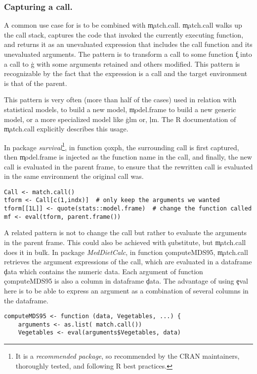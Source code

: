 \documentclass[review,screen,acmsmall,anonymous=true]{acmart}
\begin{document}
\subsubsection{Capturing a call.}  A common use case for \eval is to be combined with \c{match.call}.
\c{match.call} walks up the call stack, captures the code that invoked the
currently executing function, and returns it as an unevaluated expression that includes the call function and its unevaluated arguments. The pattern is to transform a call to some function \c{f} into a call to \c{g} with some arguments retained and others modified. This pattern is recognizable
by the fact that the expression is a call and the target environment is that of
the parent.

This pattern is very often (more than half of the cases) used in relation with statistical models, to build a new model, \c{model.frame} to build a new generic model, or a more specialized model like \c{glm} or, \c{lm}. The R documentation of \c{match.call} explicitly describes this usage.

In package \emph{survival}\footnote{It is a \emph{recommended package}, so recommended by the CRAN maintainers, thoroughly tested, and following R best practices.}, in function \c{coxph}, the surrounding call is first captured, then \c{model.frame} is injected as the function name in the call, and finally, the new call is evaluated in the parent frame, to ensure that the rewritten call
is evaluated in the same environment the original call was.

\begin{lstlisting}
Call <- match.call()
tform <- Call[c(1,indx)]  # only keep the arguments we wanted
tform[[1L]] <- quote(stats::model.frame)  # change the function called
mf <- eval(tform, parent.frame())
\end{lstlisting}

A related pattern is not to change the call but rather to evaluate the arguments in the parent frame. This could also be achieved with \c{substitute}, but \c{match.call} does it in bulk.
In package \emph{MedDietCalc},  in function \c{computeMDS95}, \c{match.call} retrieves the argument expressions of the call, which are evaluated in a dataframe \c{data} which contains the numeric data. Each argument of function \c{computeMDS95} is also a column in dataframe \c{data}. The advantage of using \c{eval} here is to be able to express an argument as a combination of several columns in the dataframe.
\begin{lstlisting}
computeMDS95 <- function (data, Vegetables, ...) {
	arguments <- as.list( match.call())
	Vegetables <- eval(arguments$Vegetables, data) 
\end{lstlisting}
\end{document}
